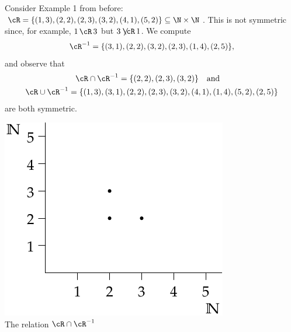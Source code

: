 \begin{example}
Consider Example 1 from before: $\cR=\{(1,3),(2,2),(2,3),(3,2),(4,1),(5,2)\}\subseteq\N\times\N$. This is not symmetric since, for example, $1\,\cR\,3$ but $3\not\!\!\cR\,1$. We compute
\[\cR^{-1}=\{(3,1),(2,2),(3,2),(2,3),(1,4),(2,5)\},\]
and observe that
\begin{gather*}
\cR\cap \cR^{-1}=\{(2,2), (2,3), (3,2)\}\quad\text{and}\quad \\
\cR\cup \cR^{-1}=\{(1,3),(3,1),(2,2),(2,3),(3,2),(4,1),(1,4),(5,2),(2,5)\}
\end{gather*}
are both symmetric.
\end{example}

\begin{center}
\begin{minipage}{0.35\textwidth}\centering
\includegraphics[width=\textwidth]{relations-03-relnint}\\
The relation $\cR\cap \cR^{-1}$
\end{minipage}\qquad\qquad\qquad
\begin{minipage}{0.35\textwidth}\centering

\end{minipage}
\end{center}
